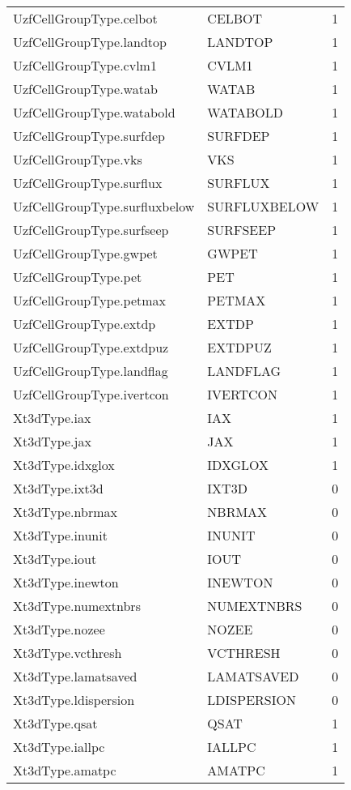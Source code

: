 \begin{longtable}{p{6cm} p{4cm} p{2cm} }
UzfCellGroupType.celbot &  CELBOT & 1 \\ 
UzfCellGroupType.landtop &  LANDTOP & 1 \\ 
UzfCellGroupType.cvlm1 &  CVLM1 & 1 \\ 
UzfCellGroupType.watab &  WATAB & 1 \\ 
UzfCellGroupType.watabold &  WATABOLD & 1 \\ 
UzfCellGroupType.surfdep &  SURFDEP & 1 \\ 
UzfCellGroupType.vks &  VKS & 1 \\ 
UzfCellGroupType.surflux &  SURFLUX & 1 \\ 
UzfCellGroupType.surfluxbelow &  SURFLUXBELOW & 1 \\ 
UzfCellGroupType.surfseep &  SURFSEEP & 1 \\ 
UzfCellGroupType.gwpet &  GWPET & 1 \\ 
UzfCellGroupType.pet &  PET & 1 \\ 
UzfCellGroupType.petmax &  PETMAX & 1 \\ 
UzfCellGroupType.extdp &  EXTDP & 1 \\ 
UzfCellGroupType.extdpuz &  EXTDPUZ & 1 \\ 
UzfCellGroupType.landflag &  LANDFLAG & 1 \\ 
UzfCellGroupType.ivertcon &  IVERTCON & 1 \\ 
Xt3dType.iax &  IAX & 1 \\ 
Xt3dType.jax &  JAX & 1 \\ 
Xt3dType.idxglox &  IDXGLOX & 1 \\ 
Xt3dType.ixt3d &  IXT3D & 0 \\ 
Xt3dType.nbrmax &  NBRMAX & 0 \\ 
Xt3dType.inunit &  INUNIT & 0 \\ 
Xt3dType.iout &  IOUT & 0 \\ 
Xt3dType.inewton &  INEWTON & 0 \\ 
Xt3dType.numextnbrs &  NUMEXTNBRS & 0 \\ 
Xt3dType.nozee &  NOZEE & 0 \\ 
Xt3dType.vcthresh &  VCTHRESH & 0 \\ 
Xt3dType.lamatsaved &  LAMATSAVED & 0 \\ 
Xt3dType.ldispersion &  LDISPERSION & 0 \\ 
Xt3dType.qsat &  QSAT & 1 \\ 
Xt3dType.iallpc &  IALLPC & 1 \\ 
Xt3dType.amatpc &  AMATPC & 1 \\ 

\end{longtable}
